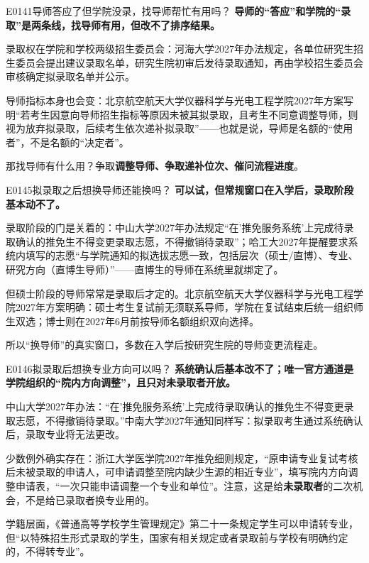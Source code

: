 \begin{qa}{E0141}{导师答应了但学院没录，找导师帮忙有用吗？}
\textbf{导师的“答应”和学院的“录取”是两条线，找导师有用，但改不了排序结果。}

录取权在学院和学校两级招生委员会：河海大学2027年办法规定，各单位研究生招生委员会提出建议录取名单，研究生院初审后发待录取通知，再由学校招生委员会审核确定拟录取名单并公示。

导师指标本身也会变：北京航空航天大学仪器科学与光电工程学院2027年方案写明“若考生因意向导师招生指标等原因未被其拟录取，且考生不同意调整导师，则视为放弃拟录取，后续考生依次递补拟录取”——也就是说，导师是名额的“使用者”，不是名额的“决定者”。

那找导师有什么用？争取\textbf{调整导师、争取递补位次、催问流程进度}。
\end{qa}

\begin{qa}{E0145}{拟录取之后想换导师还能换吗？}
\textbf{可以试，但常规窗口在入学后，录取阶段基本动不了。}

录取阶段的门是关着的：中山大学2027年办法规定“在'推免服务系统'上完成待录取确认的推免生不得变更录取志愿，不得撤销待录取”；哈工大2027年提醒要求系统内填写的志愿“与学院通知的拟选拔志愿一致，包括层次（硕士/直博）、专业、研究方向（直博生导师）”——直博生的导师在系统里就绑定了。

但硕士阶段的导师常常是录取后才定的。北京航空航天大学仪器科学与光电工程学院2027年方案明确：硕士考生复试前无须联系导师，学院在复试结束后统一组织师生双选；博士则在2027年6月前按导师名额组织双向选择。

所以“换导师”的真实窗口，多数在入学后按研究生院的导师变更流程走。
\end{qa}

\begin{qa}{E0146}{拟录取后想换专业方向可以吗？}
\textbf{系统确认后基本改不了；唯一官方通道是学院组织的“院内方向调整”，且只对未录取者开放。}

中山大学2027年办法：“在'推免服务系统'上完成待录取确认的推免生不得变更录取志愿，不得撤销待录取。”中南大学2027年通知同样写：拟录取考生通过系统确认后，录取专业将无法更改。

少数例外确实存在：浙江大学医学院2027年推免细则规定，“原申请专业复试考核后未被录取的申请人，可申请调整至院内缺少生源的相近专业”，填写院内方向调整申请表，“一次只能申请调整一个专业和单位”。注意，这是给\textbf{未录取者}的二次机会，不是给已录取者换专业用的。

学籍层面，《普通高等学校学生管理规定》第二十一条规定学生可以申请转专业，但“以特殊招生形式录取的学生，国家有相关规定或者录取前与学校有明确约定的，不得转专业”。
\end{qa}

